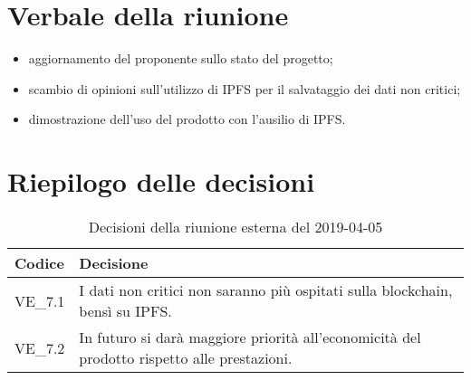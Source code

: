 \section{Verbale della riunione}
\begin{itemize}
	\item aggiornamento del proponente sullo stato del progetto;
	\item scambio di opinioni sull'utilizzo di IPFS per il salvataggio dei dati non critici;
	\item dimostrazione dell'uso del prodotto con l'ausilio di IPFS.
	

\end{itemize}

\hspace{3cm}

\section{Riepilogo delle decisioni}

	
	\begin{longtable}{ >{\centering}p{} >{}p{}}
		\caption{Decisioni della riunione esterna del 2019-04-05}\\	
		\rowcolorhead
		\textbf{\color{white}Codice} 
		& \centering\textbf{\color{white}Decisione} 
		\tabularnewline 
		\endfirsthead
		
		VE\_7.1 & I dati non critici non saranno più ospitati sulla blockchain, bensì su IPFS.
		\tabularnewline
		VE\_7.2 & In futuro si darà maggiore priorità all'economicità del prodotto rispetto alle prestazioni.
		
	\end{longtable}
	




